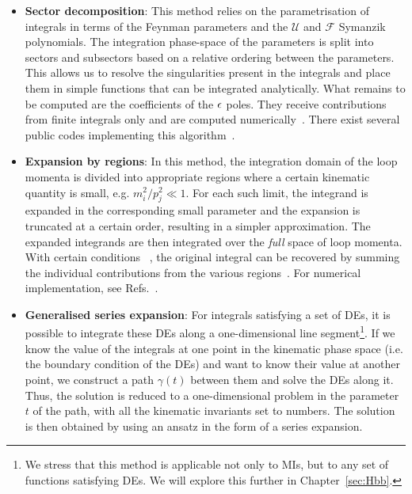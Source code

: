 \documentclass[main.tex]{subfiles}
\begin{document}
\begin{itemize}
    \item \textbf{Sector decomposition}: This method relies on the parametrisation of integrals in terms of the Feynman parameters and the $\mathcal{U}$ and $\mathcal{F}$ Symanzik polynomials. The integration phase-space of the parameters is split into sectors and subsectors based on a relative ordering between the parameters. This allows us to resolve the singularities present in the integrals and place them in simple functions that can be integrated analytically. What remains to be computed are the coefficients of the $\epsilon$ poles. They receive contributions from finite integrals only and are computed numerically~\cite{Binoth:2000ps, Binoth:2003ak}. There exist several public codes implementing this algorithm~\cite{Bogner:2007cr, Smirnov:2015mct, Borowka:2015mxa, Heinrich:2023til}.
    \item \textbf{Expansion by regions}: In this method, the integration domain of the loop momenta is divided into appropriate regions where a certain kinematic quantity is small, e.g. $m_i^2/p_j^2 \ll 1$. For each such limit, the integrand is expanded in the corresponding small parameter and the expansion is truncated at a certain order, resulting in a simpler approximation. The expanded integrands are then integrated over the \textit{full} space of loop momenta. With certain conditions ~\cite{Jantzen:2011nz}, the original integral can be recovered by summing the individual contributions from the various regions~\cite{Beneke:1997zp, Smirnov:1998vk, Smirnov:1999bza, Pak:2010pt, Ananthanarayan:2018tog}. For numerical implementation, see Refs.~\cite{Ananthanarayan:2020ptw, Jantzen:2012mw, Smirnov:2015mct, Heinrich:2021dbf}. 
    \item \textbf{Generalised series expansion}: For integrals satisfying a set of DEs, it is possible to integrate these DEs along a one-dimensional line segment\footnote{We stress that this method is applicable not only to MIs, but to any set of functions satisfying DEs. We will explore this further in Chapter~\ref{sec:Hbb}.}. If we know the value of the integrals at one point in the kinematic phase space (i.e. the boundary condition of the DEs) and want to know their value at another point, we construct a path $\gamma(t)$ between them and solve the DEs along it. Thus, the solution is reduced to a one-dimensional problem in the parameter $t$ of the path, with all the kinematic invariants set to numbers. The solution is then obtained by using an ansatz in the form of a series expansion. 


\end{itemize}
\end{document}
